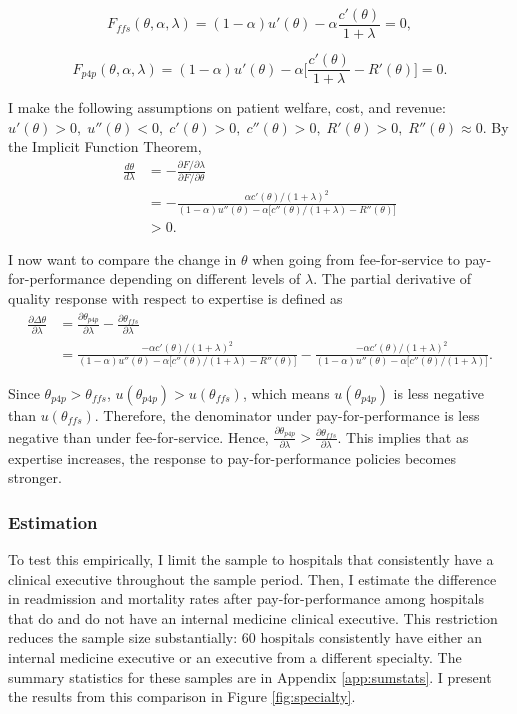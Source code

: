 \documentclass[12pt]{article}
\begin{document}
    \[
    F_{ffs}(\theta,\alpha,\lambda) = (1-\alpha)u'(\theta) - \alpha\frac{c'(\theta)}{1+\lambda} = 0,
    \]

    \[
    F_{p4p}(\theta,\alpha,\lambda) = (1-\alpha)u'(\theta) - \alpha\Bigg[\frac{c'(\theta)}{1+\lambda} - R'(\theta)\Bigg] = 0.
    \]

    \noindent I make the following assumptions on patient welfare, cost, and revenue: $u'(\theta) > 0,\; u''(\theta) < 0,\; c'(\theta) > 0,\; c''(\theta) > 0,\; R'(\theta) > 0,\; R''(\theta) \approx 0$. By the Implicit Function Theorem,
    \begin{align}
    \frac{d\theta}{d\lambda} &= -\frac{\partial F/\partial \lambda}{\partial F/\partial \theta}\\
    &= -\frac{\alpha c'(\theta)/(1+\lambda)^2}{(1-\alpha)u''(\theta)-\alpha\big[c''(\theta)/(1+\lambda)-R''(\theta)\big]}\\
    &>0. 
    \end{align}

    I now want to compare the change in $\theta$ when going from fee-for-service to pay-for-performance depending on different levels of $\lambda$. The partial derivative of quality response with respect to expertise is defined as 
    \begin{align}
        \frac{\partial \Delta \theta}{\partial \lambda} &= \frac{\partial\theta_{p4p}}{\partial \lambda} - \frac{\partial\theta_{ffs}}{\partial \lambda}\\
        &= \frac{-\alpha c'(\theta)/(1+\lambda)^2}{(1-\alpha)u''(\theta)-\alpha\big[c''(\theta)/(1+\lambda)-R''(\theta)\big]} - \frac{-\alpha c'(\theta)/(1+\lambda)^2}{(1-\alpha)u''(\theta)-\alpha\big[c''(\theta)/(1+\lambda)\big]}.
    \end{align}

    Since $\theta_{p4p}>\theta_{ffs}$, $u(\theta_{p4p})>u(\theta_{ffs})$, which means $u(\theta_{p4p})$ is less negative than $u(\theta_{ffs})$. Therefore, the denominator under pay-for-performance is less negative than under fee-for-service. Hence, $\frac{\partial\theta_{p4p}}{\partial \lambda} > \frac{\partial\theta_{ffs}}{\partial \lambda}$. This implies that as expertise increases, the response to pay-for-performance policies becomes stronger. 

    \subsubsection{Estimation}

    To test this empirically, I limit the sample to hospitals that consistently have a clinical executive throughout the sample period. Then, I estimate the difference in readmission and mortality rates after pay-for-performance among hospitals that do and do not have an internal medicine clinical executive. This restriction reduces the sample size substantially: 60 hospitals consistently have either an internal medicine executive or an executive from a different specialty. The summary statistics for these samples are in Appendix \ref{app:sumstats}. I present the results from this comparison in Figure \ref{fig:specialty}.
\end{document}

